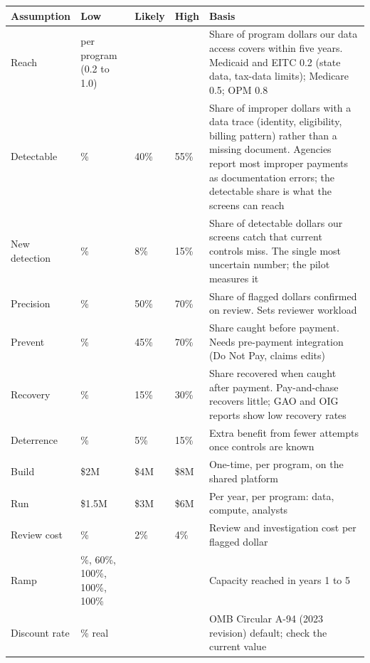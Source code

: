 \documentclass[letterpaper,11pt]{article}
\begin{document}
\begingroup\small\setlength{\tabcolsep}{4pt}\renewcommand{\arraystretch}{1.25}
\begin{longtable}[l]{@{}>{\raggedright\arraybackslash}p{}>{\raggedright\arraybackslash}p{}ll>{\raggedright\arraybackslash}p{}@{}}
\rowcolor{coolblack}\leavevmode\color{white}\bfseries Assumption & \leavevmode\color{white}\bfseries Low & \leavevmode\color{white}\bfseries Likely & \leavevmode\color{white}\bfseries High & \leavevmode\color{white}\bfseries Basis \\
\endhead
Reach & per program (0.2 to 1.0) &  &  & Share of program dollars our data access covers within five years. Medicaid and EITC 0.2 (state data, tax-data limits); Medicare 0.5; OPM 0.8 \\
Detectable & 25\% & 40\% & 55\% & Share of improper dollars with a data trace (identity, eligibility, billing pattern) rather than a missing document. Agencies report most improper payments as documentation errors; the detectable share is what the screens can reach \\
New detection & 3\% & 8\% & 15\% & Share of detectable dollars our screens catch that current controls miss. The single most uncertain number; the pilot measures it \\
Precision & 30\% & 50\% & 70\% & Share of flagged dollars confirmed on review. Sets reviewer workload \\
Prevent & 20\% & 45\% & 70\% & Share caught before payment. Needs pre-payment integration (Do Not Pay, claims edits) \\
Recovery & 5\% & 15\% & 30\% & Share recovered when caught after payment. Pay-and-chase recovers little; GAO and OIG reports show low recovery rates \\
Deterrence & 0\% & 5\% & 15\% & Extra benefit from fewer attempts once controls are known \\
Build & \$2M & \$4M & \$8M & One-time, per program, on the shared platform \\
Run & \$1.5M & \$3M & \$6M & Per year, per program: data, compute, analysts \\
Review cost & 1\% & 2\% & 4\% & Review and investigation cost per flagged dollar \\
Ramp & 25\%, 60\%, 100\%, 100\%, 100\% &  &  & Capacity reached in years 1 to 5 \\
Discount rate & 2\% real &  &  & OMB Circular A-94 (2023 revision) default; check the current value \\
\end{longtable}\endgroup
\end{document}
